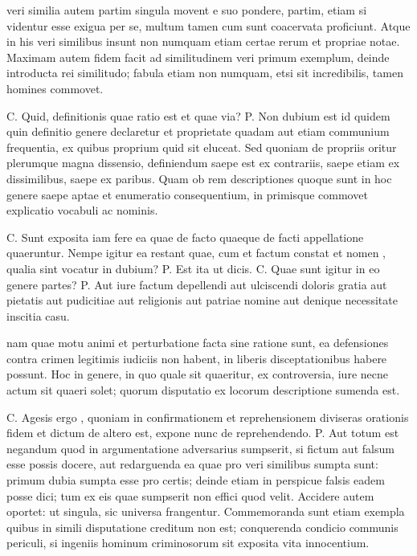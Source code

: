  veri similia autem partim singula movent e suo pondere, partim, etiam si videntur esse exigua per se, multum tamen cum sunt coacervata proficiunt. Atque in his veri similibus insunt non numquam etiam certae rerum et propriae notae. Maximam autem fidem facit ad similitudinem veri primum exemplum, deinde introducta rei similitudo; fabula etiam non numquam, etsi sit incredibilis, tamen homines commovet.

 C. Quid, definitionis quae ratio est et quae via? P. Non dubium est id quidem quin definitio genere declaretur et proprietate quadam aut etiam communium frequentia, ex quibus proprium quid sit eluceat. Sed quoniam de propriis oritur plerumque magna dissensio, definiendum saepe est ex contrariis, saepe etiam ex dissimilibus, saepe ex paribus. Quam ob rem descriptiones quoque sunt in hoc genere saepe aptae et enumeratio consequentium, in primisque commovet explicatio vocabuli ac nominis.

 C. Sunt exposita iam fere ea quae de facto quaeque de facti appellatione quaeruntur. Nempe igitur ea restant quae, cum et factum constat et nomen , qualia sint vocatur in dubium? P. Est ita ut dicis. C. Quae sunt igitur in eo genere partes? P. Aut iure factum depellendi aut ulciscendi doloris gratia aut pietatis aut pudicitiae aut religionis aut patriae nomine aut denique necessitate inscitia casu.

 nam quae motu animi et perturbatione facta sine ratione sunt, ea defensiones contra crimen legitimis iudiciis non habent, in liberis disceptationibus habere possunt. Hoc in genere, in quo quale sit quaeritur, ex controversia, iure necne actum sit quaeri solet; quorum disputatio ex locorum descriptione sumenda est.

 C. Agesis ergo , quoniam in confirmationem et reprehensionem diviseras orationis fidem et dictum de altero est, expone nunc de reprehendendo. P. Aut totum est negandum quod in argumentatione adversarius sumpserit, si fictum aut falsum esse possis docere, aut redarguenda ea quae pro veri similibus sumpta sunt: primum dubia sumpta esse pro certis; deinde etiam in perspicue falsis eadem posse dici; tum ex eis quae sumpserit non effici quod velit. Accidere autem oportet: ut singula, sic universa frangentur. Commemoranda sunt etiam exempla quibus in simili disputatione creditum non est; conquerenda condicio communis periculi, si ingeniis hominum criminosorum sit exposita vita innocentium.

